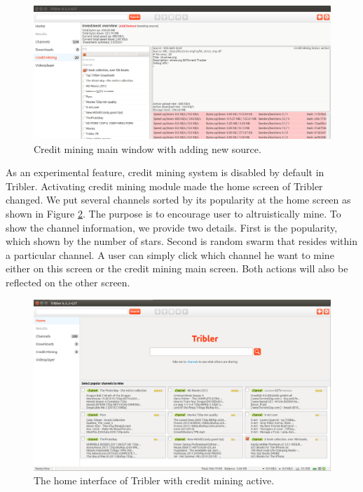 \begin{figure}[h!]
	\begin{adjustwidth}{-1.5cm}{-1cm}
			\centering
			\includegraphics[width=1.2\textwidth]{pics/overview_result.png}
			\caption{Credit mining main window with adding new source.}
			\label{fig:overview}
		
	\end{adjustwidth}
\end{figure}

As an experimental feature, credit mining system is disabled by default in Tribler. Activating credit mining module made the home screen of Tribler changed. We put several channels sorted by its popularity at the home screen as shown in Figure \ref{fig:homecm}. The purpose is to encourage user to altruistically mine. To show the channel information, we provide two details. First is the popularity, which shown by the number of stars. Second is random swarm that resides within a particular channel. A user can simply click which channel he want to mine either on this screen or the credit mining main screen. Both actions will also be reflected on the other screen. 

\begin{figure}[h]
	\includegraphics[width=\textwidth]{pics/home_channel.png}
	\caption{The home interface of Tribler with credit mining active.}
	\label{fig:homecm}
\end{figure}

